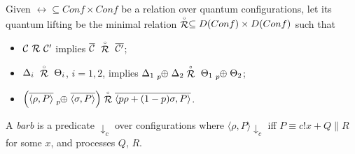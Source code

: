 \begin{definition}
	Given $\rel \subseteq Conf \times Conf$ be a relation over quantum configurations, let its quantum lifting be the minimal relation $\stackrel{\scriptscriptstyle \circ}{\mathcal{R}} \subseteq D(Conf) \times D(Conf)$ such that
	\begin{itemize}
		\item $\mathcal{C}\ \mathcal{R}\ \mathcal{C}'$ implies $\overline{\conf}\ \slift{\rel}\ \overline{\conf'}$;
		\item $\Delta_i\ \slift{\rel}\ \Theta_i$, $i = 1, 2$, implies $\Delta_1 \psum{p} \Delta_2 \slift{\rel}\ \Theta_1 \psum{p} \Theta_2$;
		\item $\left(\overline{\confw{\rho, P}} \psum{p} \overline{\confw{\sigma, P}}\right) \slift{\rel} \overline{\confw{p \rho + (1-p)\sigma, P}}$.
	\end{itemize} 
\end{definition}



\begin{definition}[Barb]
	A \emph{barb} is a predicate $\downarrow_{c}$ over configurations where $\langle \rho, P \rangle \downarrow_{c}$ iff $P \equiv c!x + Q \parallel R$ for some $x$, and processes $Q$, $R$.
\end{definition}



